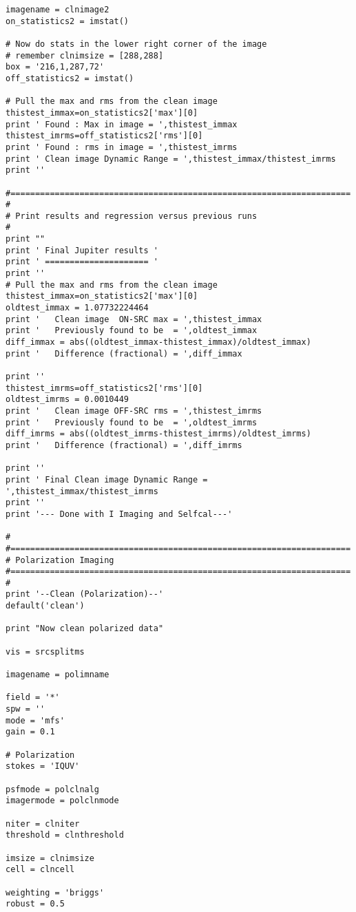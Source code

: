 \begin{verbatim}
imagename = clnimage2
on_statistics2 = imstat()

# Now do stats in the lower right corner of the image
# remember clnimsize = [288,288]
box = '216,1,287,72'
off_statistics2 = imstat()

# Pull the max and rms from the clean image
thistest_immax=on_statistics2['max'][0]
print ' Found : Max in image = ',thistest_immax
thistest_imrms=off_statistics2['rms'][0]
print ' Found : rms in image = ',thistest_imrms
print ' Clean image Dynamic Range = ',thistest_immax/thistest_imrms
print ''

#=====================================================================
#
# Print results and regression versus previous runs
#
print ""
print ' Final Jupiter results '
print ' ===================== '
print ''
# Pull the max and rms from the clean image
thistest_immax=on_statistics2['max'][0]
oldtest_immax = 1.07732224464
print '   Clean image  ON-SRC max = ',thistest_immax
print '   Previously found to be  = ',oldtest_immax
diff_immax = abs((oldtest_immax-thistest_immax)/oldtest_immax)
print '   Difference (fractional) = ',diff_immax

print ''
thistest_imrms=off_statistics2['rms'][0]
oldtest_imrms = 0.0010449
print '   Clean image OFF-SRC rms = ',thistest_imrms
print '   Previously found to be  = ',oldtest_imrms
diff_imrms = abs((oldtest_imrms-thistest_imrms)/oldtest_imrms)
print '   Difference (fractional) = ',diff_imrms

print ''
print ' Final Clean image Dynamic Range = ',thistest_immax/thistest_imrms
print ''
print '--- Done with I Imaging and Selfcal---'

#
#=====================================================================
# Polarization Imaging
#=====================================================================
#
print '--Clean (Polarization)--'
default('clean')

print "Now clean polarized data"

vis = srcsplitms

imagename = polimname

field = '*'
spw = ''
mode = 'mfs'
gain = 0.1

# Polarization
stokes = 'IQUV'

psfmode = polclnalg
imagermode = polclnmode

niter = clniter
threshold = clnthreshold

imsize = clnimsize
cell = clncell

weighting = 'briggs'
robust = 0.5


\end{verbatim}
